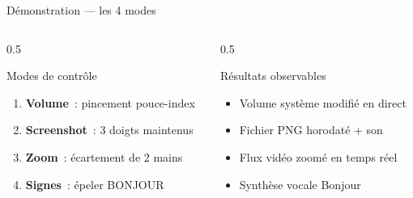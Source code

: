 \documentclass[aspectratio=169,12pt]{beamer}
\begin{document}
\begin{frame}{D\'emonstration --- les 4 modes}
  \begin{columns}
    \begin{column}{0.5\textwidth}
      \begin{block}{Modes de contr\^ole}
        \begin{enumerate}
          \item \textbf{Volume}~: pincement pouce-index
          \item \textbf{Screenshot}~: 3 doigts maintenus
          \item \textbf{Zoom}~: \'ecartement de 2 mains
          \item \textbf{Signes}~: \'epeler BONJOUR
        \end{enumerate}
      \end{block}
    \end{column}
    \begin{column}{0.5\textwidth}
      \begin{block}{R\'esultats observables}
        \begin{itemize}
          \item Volume syst\`eme modifi\'e en direct
          \item Fichier PNG horodat\'e + son
          \item Flux vid\'eo zoom\'e en temps r\'eel
          \item Synth\`ese vocale \og Bonjour \fg
        \end{itemize}
      \end{block}
    \end{column}
  \end{columns}
  \vspace{0.3cm}
  \begin{center}
  \end{center}
\end{frame}
\end{document}
